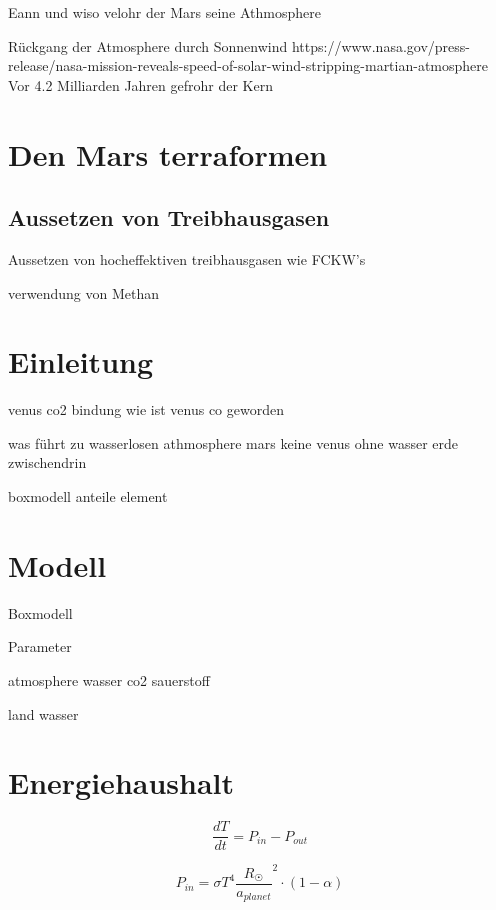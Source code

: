 \begin{refsection}
Eann und wiso velohr der Mars seine Athmosphere


Rückgang der Atmosphere durch Sonnenwind
	https://www.nasa.gov/press-release/nasa-mission-reveals-speed-of-solar-wind-stripping-martian-atmosphere
	Vor 4.2 Milliarden Jahren gefrohr der Kern


\section{Den Mars terraformen}



\subsection{Aussetzen von Treibhausgasen}

Aussetzen von hocheffektiven treibhausgasen wie FCKW's

verwendung von Methan 


\section{Einleitung}

venus co2 bindung
wie ist venus co geworden


was führt zu wasserlosen athmosphere
mars keine
venus ohne wasser
erde zwischendrin

boxmodell anteile element

\section{Modell}

Boxmodell

Parameter

atmosphere
wasser
co2
sauerstoff

land
wasser

\section{Energiehaushalt}

\begin{equation}
\frac{dT}{dt} = P_{in} - P_{out}
\end{equation}



\begin{equation}
P_{in} = \sigma T^4 \frac{R_{\astrosun}}{a_{planet}}^2 \cdot (1-\alpha)
\end{equation}


\end{refsection}
